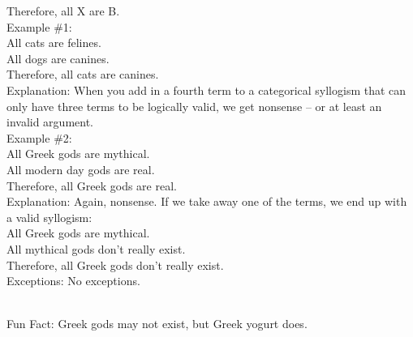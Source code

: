 \documentclass[a4paper,12pt,single,pdftex]{scrartcl}
\begin{document}
    
      Therefore, all X are B.
    \\

    
      Example \#1:
    \\

    
      All cats are felines.
    \\

    
      All dogs are canines.
    \\

    
      Therefore, all cats are canines.
    \\

    
      Explanation: When you add in a fourth term to a categorical syllogism that can only have three terms to be logically valid, we get nonsense -- or at least an invalid argument. 
    \\

    
      Example \#2:
    \\

    
      All Greek gods are mythical.
    \\

    
      All modern day gods are real.
    \\

    
      Therefore, all Greek gods are real.
    \\

    
      Explanation: Again, nonsense.  If we take away one of the terms, we end up with a valid syllogism:
    \\

    
      All Greek gods are mythical.
    \\

    
      All mythical gods don’t really exist.
    \\

    
      Therefore, all Greek gods don’t really exist.
    \\

    
      Exceptions: No exceptions. \newline

    \\

    
      Fun Fact: Greek gods may not exist, but Greek yogurt does.
    \\
\end{document}
